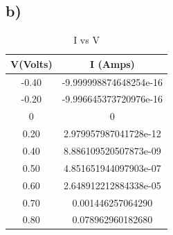 \documentclass[letterpaper,12pt]{article}
\begin{document}
    
    
\subsection{b)}

\begin{table}[H]
\begin{center}
\caption{ I vs V}
\vspace{2mm}
\begin{tabular}{||c | c ||} 
\hline
V(Volts) & I (Amps) \\ [0.5ex] 
\hline\hline
-0.40 & -9.999998874648254e-16  \\ 
\hline
-0.20 & -9.996645373720976e-16  \\ 
\hline
0 & 0  \\ 
\hline
0.20 & 2.979957987041728e-12  \\ 
\hline
0.40 & 8.886109520507873e-09  \\ 

\hline
0.50 & 4.851651944097903e-07  \\ 
\hline
0.60 & 2.648912212884338e-05  \\ 
\hline
0.70 & 0.001446257064290  \\ 
\hline
0.80 & 0.078962960182680  \\ 
\hline
\end{tabular}
\end{center}
\end{table}
\end{document}
